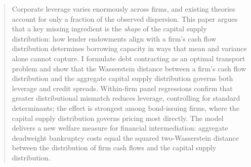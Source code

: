 \begin{abstract}
Corporate leverage varies enormously across firms, and existing theories account for only a fraction of the observed dispersion. This paper argues that a key missing ingredient is the \emph{shape} of the capital supply distribution: how lender endowments align with a firm's cash flow distribution determines borrowing capacity in ways that mean and variance alone cannot capture. I formulate debt contracting as an optimal transport problem and show that the Wasserstein distance between a firm's cash flow distribution and the aggregate capital supply distribution governs both leverage and credit spreads. Within-firm panel regressions confirm that greater distributional mismatch reduces leverage, controlling for standard determinants; the effect is strongest among bond-issuing firms, where the capital supply distribution governs pricing most directly. The model delivers a new welfare measure for financial intermediation: aggregate deadweight bankruptcy costs equal the squared two-Wasserstein distance between the distribution of firm cash flows and the capital supply distribution.
\end{abstract}

